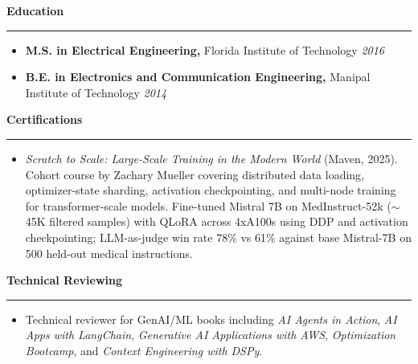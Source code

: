 \documentclass[a4paper,10pt]{article}
\newcommand{\resumesection}[1]{
    \needspace{4\baselineskip}%
    \vspace{0.22cm}
    {\large\textbf{#1}}
    \vspace{0.06cm}
    \hrule
    \vspace{0.08cm}%
    \nopagebreak
}
\begin{document}
\resumesection{Education}
\begin{itemize}[leftmargin=*, itemsep=2pt, topsep=4pt]
    \item \textbf{M.S. in Electrical Engineering,} Florida Institute of Technology \hfill \textit{2016}
    \item \textbf{B.E. in Electronics and Communication Engineering,} Manipal Institute of Technology \hfill \textit{2014}
\end{itemize}

\resumesection{Certifications}
\begin{itemize}[leftmargin=*, itemsep=3pt, topsep=4pt]
    \item \textit{Scratch to Scale: Large-Scale Training in the Modern World} (Maven, 2025). Cohort course by Zachary Mueller covering distributed data loading, optimizer-state sharding, activation checkpointing, and multi-node training for transformer-scale models. Fine-tuned Mistral 7B on MedInstruct-52k ($\sim$45K filtered samples) with QLoRA across 4xA100s using DDP and activation checkpointing; LLM-as-judge win rate 78\% vs 61\% against base Mistral-7B on 500 held-out medical instructions.
\end{itemize}

\resumesection{Technical Reviewing}
\begin{itemize}[leftmargin=*, itemsep=2pt, topsep=4pt]
    \item Technical reviewer for GenAI/ML books including \textit{AI Agents in Action}, \textit{AI Apps with LangChain}, \textit{Generative AI Applications with AWS}, \textit{Optimization Bootcamp}, and \textit{Context Engineering with DSPy}.
\end{itemize}
\end{document}
